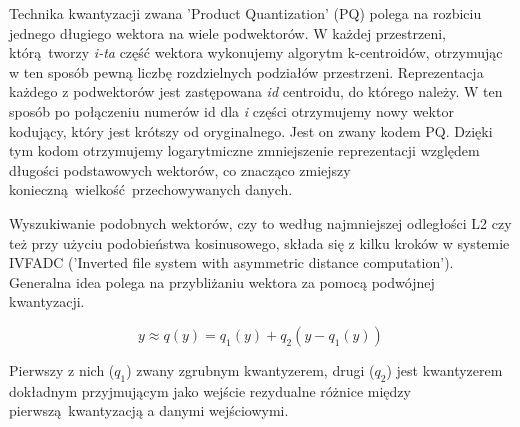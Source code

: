 Technika kwantyzacji zwana 'Product Quantization' (PQ) polega na rozbiciu jednego długiego wektora na wiele podwektorów. W każdej przestrzeni, którą tworzy \emph{i-ta} część wektora wykonujemy algorytm k-centroidów, otrzymując w ten sposób pewną liczbę rozdzielnych podziałów przestrzeni. Reprezentacja każdego z podwektorów jest zastępowana \emph{id} centroidu, do którego należy. W ten sposób po połączeniu numerów id dla \emph{i} części otrzymujemy nowy wektor kodujący, który jest krótszy od oryginalnego. Jest on zwany kodem PQ. Dzięki tym kodom otrzymujemy logarytmiczne zmniejszenie reprezentacji względem długości podstawowych wektorów, co znacząco zmiejszy konieczną wielkość przechowywanych danych. \autocite{productquantaization} \newline

Wyszukiwanie podobnych wektorów, czy to według najmniejszej odległości L2 czy też przy użyciu podobieństwa kosinusowego, składa się z kilku kroków w systemie IVFADC ('Inverted file system with asymmetric distance computation'). Generalna idea polega na przybliżaniu wektora za pomocą podwójnej kwantyzacji.

\begin{equation}
	y \approx q(y) = q_1(y) + q_2(y - q_1(y))
\end{equation}

Pierwszy z nich (\emph{$q_1$}) zwany zgrubnym kwantyzerem, drugi (\emph{$q_2$}) jest kwantyzerem dokładnym przyjmującym jako wejście rezydualne różnice między pierwszą kwantyzacją a danymi wejściowymi.\newline

